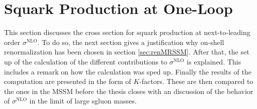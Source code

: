 \section{Squark Production at One-Loop}
This section discusses the cross section for squark production at next-to-leading order $\sigma^{\mathrm{NLO}}$. To do so, the next section gives a justification why on-shell renormalization has been chosen in section \ref{sec:renMRSSM}. After that, the set up of the calculation of the different contributions to $\sigma^{\mathrm{NLO}}$ is explained. This includes a remark on how the calculation was sped up. Finally the results of the computation are presented in the form of $K$-factors. These are then compared to the ones in the MSSM before the thesis closes with an discussion of the behavior of $\sigma^{\mathrm{NLO}}$ in the limit of large sgluon masses.

